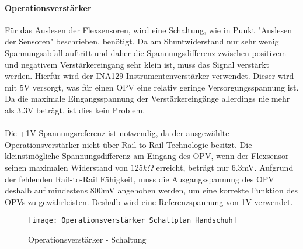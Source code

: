 \documentclass[titlepage,12pt,twoside]{article}
\begin{document}
\paragraph{Operationsverstärker}
\hfill \break
\hfill \break
Für das Auslesen der Flexsensoren, wird eine Schaltung, wie in Punkt "Auslesen der Sensoren" beschrieben, benötigt. Da am
Shuntwiderstand nur sehr wenig Spannungsabfall auftritt und daher die Spannungsdifferenz zwischen positivem und negativem 
Verstärkereingang sehr klein ist, muss das Signal verstärkt werden. Hierfür wird der INA129 Instrumentenverstärker verwendet.
Dieser wird mit 5V versorgt, was für einen OPV eine relativ geringe Versorgungsspannung ist. Da die maximale Eingangsspannung
der Verstärkereingänge allerdings nie mehr als 3.3V beträgt, ist dies kein Problem. \\
\\
Die +1V Spannungsreferenz ist notwendig, da der ausgewählte Operationsverstärker nicht über Rail-to-Rail Technologie besitzt. 
Die kleinstmögliche Spannungsdifferenz am Eingang des OPV, wenn der Flexsensor seinen maximalen Widerstand von
$125k\Omega$ erreicht, beträgt nur 6.3mV. Aufgrund der fehlenden Rail-to-Rail Fähigkeit, muss die Ausgangsspannung des OPV deshalb
auf mindestens 800mV angehoben werden, um eine korrekte Funktion des OPVs zu gewährleisten. Deshalb wird eine Referenzspannung
von 1V verwendet. \\
\begin{figure}[H]
	\begin{center}
		\scalebox{0.5}
		{\texttt{[image: Operationsverstärker\_Schaltplan\_Handschuh]}}
		\caption{Operationsverstärker - Schaltung}
		\label{fig:Operationsverstärker_Schaltplan_Handschuh}		
	\end{center}
\end{figure}
\end{document}

